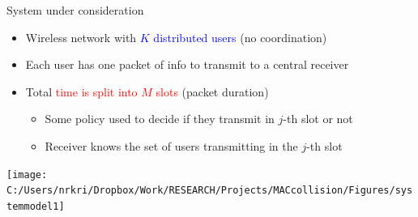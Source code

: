 \begin{frame}{System under consideration}
\begin{itemize}
\item Wireless network with \textcolor{blue}{$K$ distributed users} (no coordination)
\item Each user has one packet of info to transmit to a central receiver
\item Total \textcolor{red}{time is split into $M$ slots} (packet duration)
    \begin{itemize}
    \item Some policy used to decide if they transmit in $j$-th slot or not
    \item Receiver knows the set of users transmitting in the $j$-th slot
    \end{itemize}
\end{itemize}
\vspace*{-0.1in}
\begin{center}
\texttt{[image: C:/Users/nrkri/Dropbox/Work/RESEARCH/Projects/MACcollision/Figures/systemmodel1]}
\end{center}
\end{frame}

